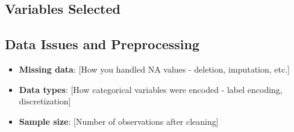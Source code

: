 \documentclass[main.tex]{subfiles}
\begin{document}
% 



% 



\subsection{Variables Selected}

\subsection{Data Issues and Preprocessing}
\begin{itemize}
  \item \textbf{Missing data}: [How you handled NA values - deletion, imputation, etc.]
  \item \textbf{Data types}: [How categorical variables were encoded - label encoding, discretization]
  \item \textbf{Sample size}: [Number of observations after cleaning]
\end{itemize}


\end{document}
